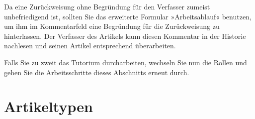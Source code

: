 \documentclass[a4paper,12pt,ngerman]{manual}
\begin{document}
Da eine Zurückweisung ohne Begründung für den Verfasser zumeist unbefriedigend
ist, sollten Sie das erweiterte Formular »Arbeitsablauf« benutzen, um ihm im
Kommentarfeld eine Begründung für die Zurückweisung zu hinterlassen. Der
Verfasser des Artikels kann diesen Kommentar in der Historie nachlesen und
seinen Artikel entsprechend überarbeiten.

Falls Sie zu zweit das Tutorium durcharbeiten, wechseln Sie nun die Rollen und
gehen Sie die Arbeitsschritte dieses Abschnitts erneut durch.

\resetcurrentobjects
\hypertarget{--doc-inhaltstypen/inhaltstypen}{}

\hypertarget{sec-inhaltstypen}{}\chapter{Artikeltypen}
\end{document}
